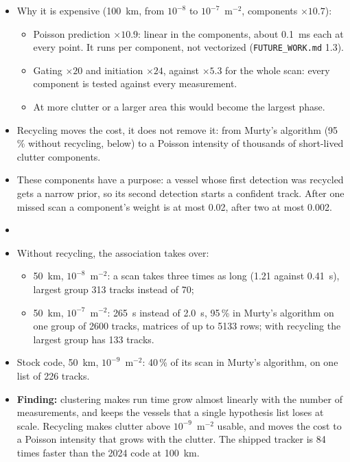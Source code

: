 \begin{itemize}
\begin{itemize}
        \item It is bounded, not a leak. At 100~km and $10^{-7}$~m$^{-2}$: 3223 components at scan 0, 15\,518 at scan 4, then between 13\,900 and 11\,000.
    \end{itemize}
    \item Why it is expensive (100~km, from $10^{-8}$ to $10^{-7}$~m$^{-2}$, components $\times 10.7$):
    \begin{itemize}
        \item Poisson prediction $\times 10.9$: linear in the components, about 0.1~ms each at every point. It runs per component, not vectorized (\texttt{FUTURE\_WORK.md} 1.3).
        \item Gating $\times 20$ and initiation $\times 24$, against $\times 5.3$ for the whole scan: every component is tested against every measurement.
        \item At more clutter or a larger area this would become the largest phase.
    \end{itemize}
    \item Recycling moves the cost, it does not remove it: from Murty's algorithm (95\,\% without recycling, below) to a Poisson intensity of thousands of short-lived clutter components.
    \item These components have a purpose: a vessel whose first detection was recycled gets a narrow prior, so its second detection starts a confident track. After one missed scan a component's weight is at most 0.02, after two at most 0.002.
    \item {}
    \item Without recycling, the association takes over:
    \begin{itemize}
        \item 50~km, $10^{-8}$~m$^{-2}$: a scan takes three times as long (1.21 against 0.41~s), largest group 313 tracks instead of 70;
        \item 50~km, $10^{-7}$~m$^{-2}$: 265~s instead of 2.0~s, 95\,\% in Murty's algorithm on one group of 2600 tracks, matrices of up to 5133 rows; with recycling the largest group has 133 tracks.
    \end{itemize}
    \item Stock code, 50~km, $10^{-9}$~m$^{-2}$: 40\,\% of its scan in Murty's algorithm, on one list of 226 tracks.
    \item \textbf{Finding:} clustering makes run time grow almost linearly with the number of measurements, and keeps the vessels that a single hypothesis list loses at scale. Recycling makes clutter above $10^{-9}$~m$^{-2}$ usable, and moves the cost to a Poisson intensity that grows with the clutter. The shipped tracker is 84 times faster than the 2024 code at 100~km.
\end{itemize}

